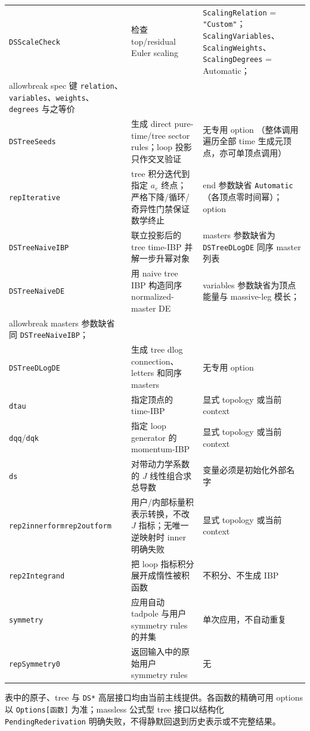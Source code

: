 ﻿\documentclass[a4paper,11pt]{article}
\begin{document}
\begin{longtable}{@{}>{\raggedright\arraybackslash}p{}>{\raggedright\arraybackslash}p{}>{\raggedright\arraybackslash}p{}@{}}
\texttt{DSScaleCheck} & 检查 top/residual Euler scaling & \texttt{ScalingRelation} = \texttt{"Custom"}；\allowbreak\texttt{ScalingVariables}、\allowbreak\texttt{ScalingWeights}、\allowbreak\texttt{ScalingDegrees} = Automatic；\\allowbreak spec 键 \texttt{relation}、\allowbreak\texttt{variables}、\allowbreak\texttt{weights}、\allowbreak\texttt{degrees} 与之等价 \\
\texttt{DSTreeSeeds} & 生成 direct pure-time/tree sector rules；loop 投影只作交叉验证 & 无专用 option （整体调用遍历全部 time 生成元顶点，亦可单顶点调用） \\
\texttt{repIterative} & tree 积分迭代到指定 $a_e$ 终点；严格下降/循环/奇异性门禁保证数学终止 & end 参数缺省 \texttt{Automatic} （各顶点零时间幂）； option \\
\texttt{DSTreeNaiveIBP} & 联立投影后的 tree time-IBP 并解一步升幂对象 & masters 参数缺省为 \texttt{DSTreeDLogDE} 同序 master 列表 \\
\texttt{DSTreeNaiveDE} & 用 naive tree IBP 构造同序 normalized-master DE & variables 参数缺省为顶点能量与 massive-leg 模长；\\allowbreak masters 参数缺省同 \texttt{DSTreeNaiveIBP}； \\
\texttt{DSTreeDLogDE} & 生成 tree dlog connection、letters 和同序 masters & 无专用 option \\
\texttt{dtau} & 指定顶点的 time-IBP & 显式 topology 或当前 context \\
\texttt{dqq}/\texttt{dqk} & 指定 loop generator 的 momentum-IBP & 显式 topology 或当前 context \\
\texttt{ds} & 对带动力学系数的 $J$ 线性组合求总导数 & 变量必须是初始化外部名字 \\
\texttt{rep2innerform}\newline\texttt{rep2outform} & 用户/内部标量积表示转换，不改 $J$ 指标；无唯一逆映射时 inner 明确失败 & 显式 topology 或当前 context \\
\texttt{rep2Integrand} & 把 loop 指标积分展开成惰性被积函数 & 不积分、不生成 IBP \\
\texttt{symmetry} & 应用自动 tadpole 与用户 symmetry rules 的并集 & 单次应用，不自动重复 \\
\texttt{repSymmetry0} & 返回输入中的原始用户 symmetry rules & 无 \\
\end{longtable}
\endgroup

表中的原子、tree 与 \texttt{DS*} 高层接口均由当前主线提供。各函数的精确可用 options 以 \texttt{Options[函数]} 为准；massless 公式型 tree 接口以结构化 \texttt{PendingRederivation} 明确失败，不得静默回退到历史表示或不完整结果。
\end{document}
